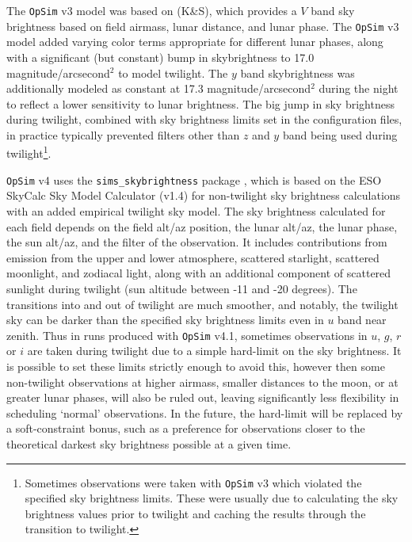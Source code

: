 \documentclass[DM,lsstdraft,authoryear,toc]{lsstdoc}
\newcommand{\opsim}{\texttt{OpSim}\xspace}
\newcommand{\simsky}{\texttt{sims\_skybrightness}\xspace}
\newcommand{\magasq}{magnitude/arcsecond$^{2}$\xspace}
\begin{document}
The \opsim v3 model was based on \citet{1991PASP..103.1033K} (K\&S), which provides a $V$ band sky brightness based on field airmass, lunar distance, and lunar phase. The \opsim v3 model added varying color terms appropriate for different lunar phases, along with a significant (but constant) bump in skybrightness to 17.0 \magasq to model twilight. The $y$ band skybrightness was additionally modeled as constant at 17.3 \magasq during the night to reflect a lower sensitivity to lunar brightness.  The big jump in sky brightness during twilight, combined with sky brightness limits set in the configuration files, in practice typically prevented filters other than $z$ and $y$ band being used during twilight\footnote{Sometimes observations were taken with \opsim v3 which violated the specified sky brightness limits. These were usually due to calculating the sky brightness values prior to twilight and caching the results through the transition to twilight.}.

\opsim v4 uses the \simsky package \citep{2016SPIE.9910E..1AY}, which is based on the ESO SkyCalc Sky Model Calculator  (v1.4) for non-twilight sky brightness calculations with an added empirical twilight sky model. The sky brightness calculated for each field depends on the field alt/az position, the lunar alt/az, the lunar phase, the sun alt/az, and the filter of the observation. It includes contributions from emission from the upper and lower atmosphere, scattered starlight, scattered moonlight, and zodiacal light, along with an additional component of scattered sunlight during twilight (sun altitude between -11 and -20 degrees). The transitions into and out of twilight are much smoother, and notably, the twilight sky can be darker than the specified sky brightness limits even in $u$ band near zenith. Thus in runs produced with \opsim v4.1, sometimes observations in $u$, $g$, $r$ or $i$ are taken during twilight due to a simple hard-limit on the sky brightness. It is possible to set these limits strictly enough to avoid this, however then some non-twilight observations at higher airmass, smaller distances to the moon, or at greater lunar phases, will also be ruled out, leaving significantly less flexibility in scheduling `normal' observations. In the future, the hard-limit will be replaced by a soft-constraint bonus, such as a preference for observations closer to the theoretical darkest sky brightness possible at a given time. 

\end{document}
